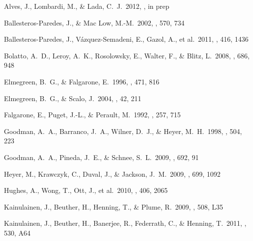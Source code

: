 \begin{thebibliography}{25}

 Alves, J., Lombardi, M., \& Lada, C.~J.\ 2012, \aap, in prep

 Ballesteros-Paredes, J., \& Mac Low, M.-M.\ 2002, \apj, 570, 734


Ballesteros-Paredes, J., V{\'a}zquez-Semadeni, E., Gazol, A., et al.\ 2011,
\mnras, 416, 1436

 Bolatto, A.~D., Leroy,
A.~K., Rosolowsky, E., Walter, F., \& Blitz, L.\ 2008, \apj, 686, 948


 Elmegreen, B.~G., \& Falgarone, E.\ 1996, \apj, 471, 816

 Elmegreen, B.~G., \& Scalo, J.\ 2004, \araa, 42, 211


 Falgarone, E., Puget, J.-L., \& Perault, M.\ 1992, \aap, 257, 715



 Goodman, A.~A.,
Barranco, J.~A., Wilner, D.~J., \& Heyer, M.~H.\ 1998, \apj, 504, 223

 Goodman, A.~A., Pineda,
J.~E., \& Schnee, S.~L.\ 2009, \apj, 692, 91

 Heyer, M., Krawczyk, C.,
Duval, J., \& Jackson, J.~M.\ 2009, \apj, 699, 1092

 Hughes, A., Wong, T.,
Ott, J., et al.\ 2010, \mnras, 406, 2065

 Kainulainen, J., Beuther, H., Henning, T., \& Plume, R.\ 2009, \aap, 508, L35

 Kainulainen, J., Beuther, H., Banerjee, R., Federrath, C., \& Henning, T.\ 2011, \aap, 530, A64


\end{thebibliography}
